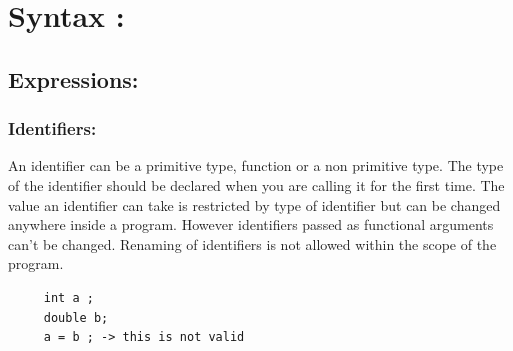 \documentclass[english,a4paper,12pt]{report}
\begin{document}
\section{Syntax :}

\subsection{Expressions:}
\subsubsection{Identifiers:}
An identifier can be a primitive type, function or a non primitive type. The type of the identifier should be declared when you are calling it for the first time. The value an identifier can take is restricted by type of identifier but can be changed anywhere inside a program. However identifiers passed as functional arguments can't be changed. Renaming of identifiers is not allowed within the scope of the program.
\begin{verbatim}
     int a ;
     double b;
     a = b ; -> this is not valid 
\end{verbatim}
 
\end{document}
